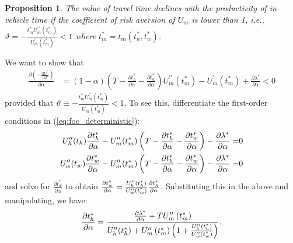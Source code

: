 \documentclass[12pt,a4paper,british]{article}
\makeatletter
\newenvironment{proof}[1][\proofname]{\par
    \normalfont\topsep6\p@\@plus6\p@\relax
    \trivlist
    \itemindent\parindent
    \item[\hskip\labelsep
          \scshape
      #1]\ignorespaces
  }{%
    \endtrivlist\@endpefalse
  }
\providecommand{\proofname}{Proof}
\newtheorem{prop}{Proposition}[section]
\makeatother
\begin{document}
\begin{prop}
The value of travel time declines with the productivity of in-vehicle time if the coefficient of risk aversion of $U_{m}$ is lower than 1, i.e., $\vartheta=-\frac{t_{m}^{\ast}U_{m}^{\prime\prime}\left(t_{m}^{\ast}\right)}{U_{m}^{\prime}\left(t_{m}^{\ast}\right)}<1$ where $t_{m}^{\ast}=t_{m}\left(t_{h}^{\ast},t_{w}^{\ast}\right)$.
\end{prop}


\begin{proof}
We want to show that
\begin{align*}
\frac{\partial\left(-\frac{\mathrm{d}U^{\ast}}{\mathrm{d}T}\right)}{\partial\alpha} & =\left(1-\alpha\right)\left(T-\frac{\partial t_{h}^{\ast}}{\partial\alpha}-\frac{\partial t_{w}^{\ast}}{\partial\alpha}\right)U_{m}^{\prime\prime}\left(t_{m}^{\ast}\right)-U_{m}^{\prime}\left(t_{m}^{\ast}\right)+\frac{\partial\lambda^{\ast}}{\partial\alpha}<0
\end{align*}
provided that $\vartheta\equiv-\frac{t_{m}^{\ast}U_{m}^{\prime\prime}\left(t_{m}^{\ast}\right)}{U_{m}^{\prime}\left(t_{m}^{\ast}\right)}<1$. To see this, differentiate the first-order conditions in (\ref{eq:foc_deterministic}):
\begin{align*}
U_{h}^{\prime\prime}\text{\ensuremath{\left(t_{h}\right)}}\frac{\partial t_{h}^{\ast}}{\partial\alpha}-U_{m}^{\prime\prime}\text{\ensuremath{\left(t_{m}^{\ast}\right)}}\left(T-\frac{\partial t_{h}^{\ast}}{\partial\alpha}-\frac{\partial t_{w}^{\ast}}{\partial\alpha}\right)-\frac{\partial\lambda^{\ast}}{\partial\alpha}= & 0\\
U_{w}^{\prime\prime}\text{\ensuremath{\left(t_{w}\right)}}\frac{\partial t_{w}^{\ast}}{\partial\alpha}-U_{m}^{\prime\prime}\text{\ensuremath{\left(t_{m}^{\ast}\right)}}\left(T-\frac{\partial t_{h}^{\ast}}{\partial\alpha}-\frac{\partial t_{w}^{\ast}}{\partial\alpha}\right)-\frac{\partial\lambda^{\ast}}{\partial\alpha}= & 0
\end{align*}
and solve for $\frac{\partial t_{w}^{\ast}}{\partial\alpha}$ to obtain $\frac{\partial t_{w}^{\ast}}{\partial\alpha}=\frac{U_{h}^{\prime\prime}\text{\ensuremath{\left(t_{h}^{\ast}\right)}}}{U_{w}^{\prime\prime}\text{\ensuremath{\left(t_{w}^{\ast}\right)}}}\frac{\partial t_{h}^{\ast}}{\text{\ensuremath{\partial\alpha}}}$. Substituting this in the above and manipulating, we have: 
\begin{equation*}
\frac{\partial t_{h}^{\ast}}{\partial\alpha}=\frac{\frac{\partial\lambda^{\ast}}{\partial\alpha}+TU_{m}^{\prime\prime}\left(t_{m}^{\ast}\right)}{U_{h}^{\prime\prime}\text{\ensuremath{\left(t_{h}^{\ast}\right)}}+U_{m}^{\prime\prime}\left(t_{m}^{\ast}\right)\left(1+\frac{U_{h}^{\prime\prime}\text{\ensuremath{\left(t_{h}^{\ast}\right)}}}{U_{w}^{\prime\prime}\text{\ensuremath{\left(t_{w}^{\ast}\right)}}}\right)}.

\end{equation*}
\end{proof}
\end{document}
